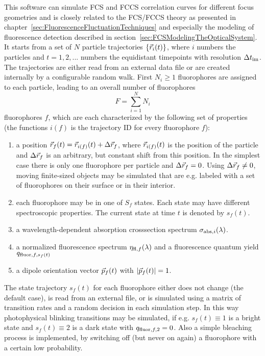 This software can simulate FCS and FCCS correlation curves for different focus geometries and is closely related to the FCS/FCCS theory as presented in chapter~\ref{sec:FluorescenceFluctuationTechniques} and especially the modeling of fluorescence detection described in section~\ref{sec:FCSModelingTheOpticalSystem}. It starts from a set of $N$ particle trajectories $\{\vec{r}_i(t)\}$, where $i$ numbers the particles and $t=1,2,...$ numbers the equidistant timepoints with resolution $\Delta t_{\text{im}}$. The trajectories are either read from an external data file or are created internally by a configurable random walk. First $N_i\geq 1$ fluorophores are assigned to each particle, leading to an overall number of fluorophores \[  F=\sum\limits_{i=1}^NN_i  \] fluorophores $f$, which are each  characterized by the following set of properties (the functions $i(f)$ is the trajectory ID for every fluorophore $f$):
\begin{enumerate}
	\item a position $\vec{r}_f(t)=\vec{r}_{i(f)}(t)+\Delta\vec{r}_{f}$, where $\vec{r}_{i(f)}(t)$ is the position of the particle and $\Delta\vec{r}_f$ is an arbitrary, but constant shift from this position. In the simplest case there is only one fluorophore per particle and $\Delta\vec{r}_f=0$. Using $\Delta\vec{r}_f\neq0$, moving finite-sized objects may be simulated that are e.g. labeled with a set of fluorophores on their surface or in their interior.
  \item each fluorophore may be in one of $S_f$ states. Each state may have different spectroscopic properties. The current state at time $t$ is denoted by $s_f(t)$. 
  \item a wavelength-dependent absorption crosssection spectrum $\sigma_{\text{abs},i}(\lambda)$.
  \item a normalized fluorescence spectrum $\eta_{\text{fl},f}(\lambda)$ and a fluorescence quantum yield $q_{\text{fluor},f,s_f(t)}$
  \item a dipole orientation vector $\vec{p}_f(t)$ with $|\vec{p}_f(t)|=1$.
\end{enumerate}
The state trajectory $s_f(t)$ for each fluorophore either does not change (the default case), is read from an external file, or is simulated using a matrix of transition rates and a random decision in each simulation step. In this way photophysical blinking transitions may be simulated, if e.g. $s_f(t)\equiv1$ is a bright state and $s_f(t)\equiv2$ is a dark state with $q_{\text{fluor},f,2}=0$. Also a simple bleaching process is implemented, by switching off (but never on again) a fluorophore with a certain low probability.

